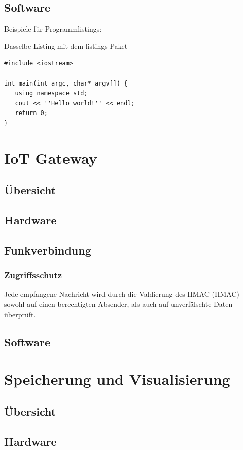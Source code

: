 \documentclass[
  10pt, %
  a4paper, %
  twoside, %
  openright, %
  numbers=noenddot, %
  BCOR=5mm, %
  parskip=half*, %
  thesis, %
]{bfhbook}
\begin{document}
 \section{Software}
Beispiele für Programmlistings:

Dasselbe Listing mit dem listings-Paket
\lstset{language=C}
\begin{lstlisting}
#include <iostream>

int main(int argc, char* argv[]) {
   using namespace std;
   cout << ''Hello world!'' << endl;
   return 0;
}
\end{lstlisting}

%
\chapter{IoT Gateway}
\section{Übersicht}
\section{Hardware}
\section{Funkverbindung}
\subsection{Zugriffsschutz}
Jede empfangene Nachricht wird durch die Valdierung des HMAC (\Gls{HMAC}) sowohl auf einen berechtigten Absender, als auch auf unverfälschte Daten überprüft.
\section{Software}
\chapter{Speicherung und Visualisierung}
\section{Übersicht}
\section{Hardware}
\end{document}
